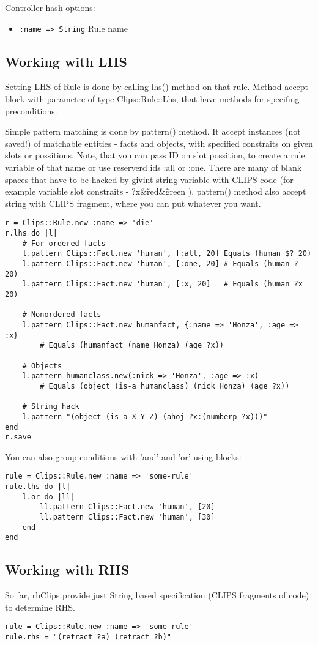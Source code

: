 \documentclass[a4paper,10pt]{article}
\begin{document}
Controller hash options:
\begin{itemize}
 \item \texttt{:name => String} Rule name
\end{itemize}


\subsection{Working with LHS}
Setting LHS of Rule is done by calling lhs() method on that rule. Method accept block with parametre of type Clips::Rule::Lhs, that have methods for specifing preconditions.

Simple pattern matching is done by pattern() method. It accept instances (not saved!) of matchable entities - facts and objects, with specified constraits on given slots or possitions. Note, that you can pass ID on slot possition, to create a rule variable of that name or use reserverd ids :all or :one. There are many of blank spaces that have to be hacked by givint string variable with CLIPS code (for example variable slot constraits - ?x\&\~red\&\~green ). pattern() method also accept string with CLIPS fragment, where you can put whatever you want.

\begin{verbatim}
r = Clips::Rule.new :name => 'die'
r.lhs do |l|
	# For ordered facts
	l.pattern Clips::Fact.new 'human', [:all, 20] Equals (human $? 20)
	l.pattern Clips::Fact.new 'human', [:one, 20] # Equals (human ? 20)
	l.pattern Clips::Fact.new 'human', [:x, 20]   # Equals (human ?x 20)
	
	# Nonordered facts
	l.pattern Clips::Fact.new humanfact, {:name => 'Honza', :age => :x} 
		# Equals (humanfact (name Honza) (age ?x))

	# Objects
 	l.pattern humanclass.new(:nick => 'Honza', :age => :x)
		# Equals (object (is-a humanclass) (nick Honza) (age ?x))
	
	# String hack
	l.pattern "(object (is-a X Y Z) (ahoj ?x:(numberp ?x)))"
end
r.save
\end{verbatim}

You can also group conditions with 'and' and 'or' using blocks:
\begin{verbatim}
rule = Clips::Rule.new :name => 'some-rule'
rule.lhs do |l|
	l.or do |ll|
		ll.pattern Clips::Fact.new 'human', [20]
		ll.pattern Clips::Fact.new 'human', [30]
	end
end
\end{verbatim}

\subsection{Working with RHS}
So far, rbClips provide just String based specification (CLIPS fragments of code) to determine RHS.
\begin{verbatim}
rule = Clips::Rule.new :name => 'some-rule'
rule.rhs = "(retract ?a) (retract ?b)"
\end{verbatim}
\end{document}
